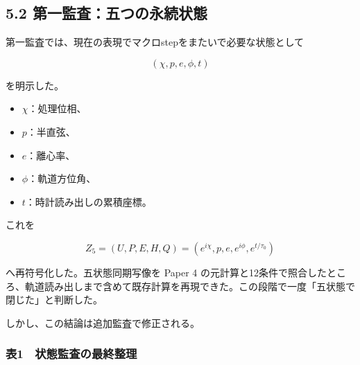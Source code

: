 \documentclass[
  a4paper,
]{ltjsarticle}
\providecommand{\tightlist}{%
  \setlength{\itemsep}{0pt}\setlength{\parskip}{0pt}}
\begin{document}
\subsection{5.2
第一監査：五つの永続状態}\label{ux7b2cux4e00ux76e3ux67fbux4e94ux3064ux306eux6c38ux7d9aux72b6ux614b}

第一監査では、現在の表現でマクロstepをまたいで必要な状態として

\[
(\chi,p,e,\phi,t)
\]

を明示した。

\begin{itemize}
\tightlist
\item
  \(\chi\)：処理位相、
\item
  \(p\)：半直弦、
\item
  \(e\)：離心率、
\item
  \(\phi\)：軌道方位角、
\item
  \(t\)：時計読み出しの累積座標。
\end{itemize}

これを

\[
Z_5=(U,P,E,H,Q)
=(e^{i\chi},p,e,e^{i\phi},e^{t/\tau_0})
\]

へ再符号化した。五状態同期写像を Paper 4
の元計算と12条件で照合したところ、軌道読み出しまで含めて既存計算を再現できた。この段階で一度「五状態で閉じた」と判断した。

しかし、この結論は追加監査で修正される。

\subsubsection{表1　状態監査の最終整理}\label{ux88681-ux72b6ux614bux76e3ux67fbux306eux6700ux7d42ux6574ux7406}
\end{document}

